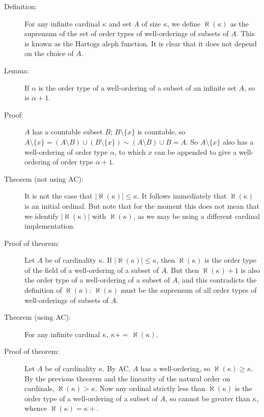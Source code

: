 \documentclass[12pt]{book}
\begin{document}
\begin{description}

\item[Definition:]  For any infinite cardinal $\kappa$ and set $A$ of size $\kappa$, we define $\aleph(\kappa)$ as the supremum of the set of order types of well-orderings of subsets of $A$.  This is known as the Hartogs aleph function.  It is clear that it does not depend on the choice of $A$.  

\item[Lemma:]  If $\alpha$ is the order type of a well-ordering of a subset of an infinite set $A$, so is $\alpha+1$.

\item[Proof:]  $A$ has a countable subset $B$;  $B \setminus \{x\}$ is countable, so $A \setminus \{x\} = (A \setminus B) \cup (B \setminus \{x\}) \sim (A \setminus B) \cup B = A$.
So $A \setminus \{x\}$ also has a well-ordering of order type $\alpha$, to which $x$ can be appended to give a well-ordering of order type $\alpha+1$.

\item[Theorem (not using AC):]  It is not the case that $|\aleph(\kappa)| \leq \kappa$.  It follows immediately that $\aleph(\kappa)$ is an initial ordinal.  But note that for the moment this does not mean that we identify $|\aleph(\kappa)|$ with $\aleph(\kappa)$, as we may be using a different cardinal implementation.

\item[Proof of theorem:]  Let $A$ be of cardinality $\kappa$.  If $|\aleph(\kappa)| \leq \kappa$, then $\aleph(\kappa)$ is the order type of the field of a well-ordering of a subset of $A$.  But then
$\aleph(\kappa)+1$ is also the order type of a well-ordering of a subset of $A$, and this contradicts the definition of $\aleph(\kappa)$:  $\aleph(\kappa)$ must be the supremum of all order types of well-orderings of subsets of $A$.

\item[Theorem (using AC):]  For any infinite cardinal $\kappa$, $\kappa+ = \,\aleph(\kappa)$.

\item[Proof of theorem:]  Let $A$ be of cardinality $\kappa$.  By AC, $A$ has a well-ordering, so $\aleph(\kappa) \geq \kappa$.  By the previous theorem and the linearity of the natural order on cardinals, $\aleph(\kappa)>\kappa$.  Now any ordinal strictly less than $\aleph(\kappa)$ is the order type of a well-ordering of a subset of $A$, so cannot be
greater than $\kappa$, whence $\aleph(\kappa)=\kappa+$.


\end{description}
\end{document}
